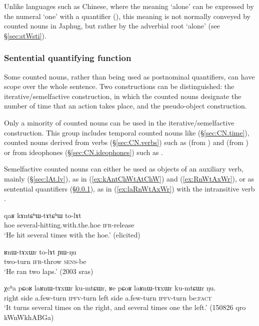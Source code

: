 Unlike languages such as Chinese, where the meaning  `alone' can be expressed by the numeral `one' with a quantifier (), this meaning is not normally conveyed by counted nouns in Japhug, but rather by the adverbial root  `alone' (see §\ref{sec:stWsti}).

\subsubsection{Sentential quantifying function } \label{sec:CN.iterative}
Some counted nouns, rather than being used as postnominal quantifiers, can have scope over the whole sentence. Two constructions can be distinguished: the iterative/semelfactive construction, in which the counted nouns designate the number of time that an action takes place, and the pseudo-object construction.

Only a minority of counted nouns can be used in the iterative/semelfactive construction. This group includes temporal counted nouns like  (§\ref{sec:CN.time}),  counted nouns derived from verbs (§\ref{sec:CN.verbs})  such as  (from ) and  (from ) or from ideophones  (§\ref{sec:CN.ideophones}) such as .

Semelfactive counted nouns can either be used as objects of an auxiliary verb, mainly  (§\ref{sec:lAt.lv}), as in (\ref{ex:kAntChWtAtChW}) and (\ref{ex:RnWtAxWr}), or as sentential quantifiers (§\ref{sec:CN.iterative}), as in (\ref{ex:laRnWtAxWr}) with the intransitive verb .

\begin{exe}
	\ex \label{ex:kAntChWtAtChW}
	\gll qaʁ kɤntɕʰɯ-tɤtɕʰɯ to-lɤt \\
	hoe several-hitting.with.the.hoe \textsc{ifr}-release \\
	\glt `He hit several times with the hoe.' (elicited)
\end{exe}

\begin{exe}
	\ex \label{ex:RnWtAxWr}
	\gll ʁnɯ-tɤxɯr to-lɤt ɲɯ-ŋu \\
	two-turn \textsc{ifr}-throw \textsc{sens}-be \\
	\glt `He ran two laps.' (2003 sras)
\end{exe}

\begin{exe}
	\ex \label{ex:laRnWtAxWr}
	\gll χcʰa pɕoʁ laʁnɯ-tɤxɯr ku-mtɕɯr, ʁe pɕoʁ laʁnɯ-tɤxɯr ku-mtɕɯr ŋu. \\
	right side a.few-turn \textsc{ipfv}-turn left side a.few-turn \textsc{ipfv}-turn be:\textsc{fact} \\
	\glt `It turns several times on the right, and several times one the left.' (150826 qro kWnWkhABGa)
\end{exe}


